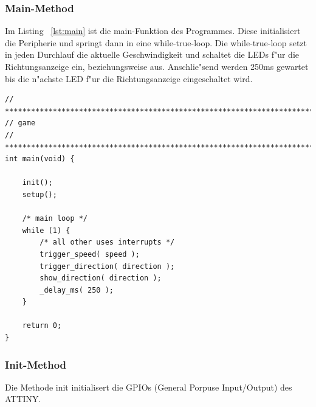 \subsubsection{Main-Method}

Im Listing ~\ref{lst:main} ist die main-Funktion des Programmes. Diese initialisiert die Peripherie und springt dann in eine while-true-loop.
Die while-true-loop setzt in jeden Durchlauf die aktuelle Geschwindigkeit und schaltet die LEDs f"ur die Richtungsanzeige ein, beziehungsweise aus. Anschlie"send werden 250ms gewartet bis die n"achste LED f"ur die Richtungsanzeige eingeschaltet wird. 

\vspace{0.5cm}
\begin{lstlisting}[caption={Main-Method},label=lst:main]
// ****************************************************************************
// game
// ***************************************************************************/
int main(void) {

	init();
	setup();

	/* main loop */
	while (1) {
		/* all other uses interrupts */
		trigger_speed( speed );
		trigger_direction( direction );
		show_direction( direction );
		_delay_ms( 250 );
	}

	return 0;
}
\end{lstlisting}
\vspace{0.5cm}

\subsubsection{Init-Method}

Die Methode init initialisert die GPIOs (General Porpuse Input/Output) des ATTINY.

